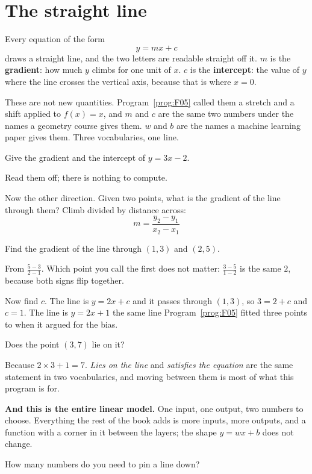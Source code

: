 \section{The straight line}
\label{sec:F06-line}

\begin{fr}
Every equation of the form
\[ y = mx + c \]
draws a straight line, and the two letters are readable straight off it. $m$
is the \textbf{gradient}: how much $y$ climbs for one unit of $x$. $c$ is the
\textbf{intercept}: the value of $y$ where the line crosses the vertical axis,
because that is where $x = 0$.

These are not new quantities. Program~\ref{prog:F05} called them a stretch and
a shift applied to $f(x) = x$, and $m$ and $c$ are the same two numbers under
the names a geometry course gives them. $w$ and $b$ are the names a machine
learning paper gives them. Three vocabularies, one line.

Give the gradient and the intercept of $y = 3x - 2$.
\nextframe
\end{fr}

\begin{fr}
Read them off; there is nothing to compute.

Now the other direction. Given two points, what is the gradient of the line
through them? Climb divided by distance across:
\[ m = \frac{y_2 - y_1}{x_2 - x_1} \]

Find the gradient of the line through $(1, 3)$ and $(2, 5)$.
\nextframe
\end{fr}

\begin{fr}
From $\frac{5 - 3}{2 - 1}$. Which point you call the first does not matter:
$\frac{3 - 5}{1 - 2}$ is the same $2$, because both signs flip together.

Now find $c$. The line is $y = 2x + c$ and it passes through $(1, 3)$, so
$3 = 2 + c$ and $c = 1$. The line is $y = 2x + 1$ \dash{} the same line
Program~\ref{prog:F05} fitted three points to when it argued for the bias.

Does the point $(3, 7)$ lie on it?
\nextframe
\end{fr}

\begin{fr}
Because $2 \times 3 + 1 = 7$. \emph{Lies on the line} and \emph{satisfies the
equation} are the same statement in two vocabularies, and moving between them
is most of what this program is for.

\textbf{And this is the entire linear model.} One input, one output, two
numbers to choose. Everything the rest of the book adds is more inputs, more
outputs, and a function with a corner in it between the layers; the shape
$y = wx + b$ does not change.

How many numbers do you need to pin a line down?
\nextframe
\end{fr}

